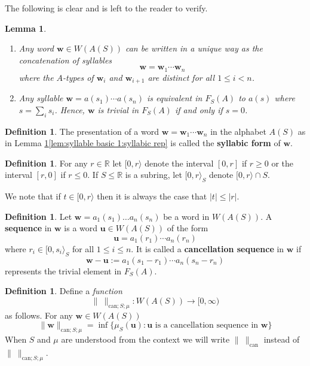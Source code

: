 \documentclass[12pt]{amsart}
\newtheorem{lemma}[prop]{Lemma}
\theoremstyle{definition}
\newtheorem{defn}[prop]{Definition}
\def\RR{\ensuremath{\mathbb{R}}}
\newcommand{\B}[1]{\mathbf{#1}}
\def\can{\text{can}}
\def\Free{F}
\newcommand{\myinterval}[1]{[ #1 \rangle}
\begin{document}
The following is clear and is left to the reader to verify.

\begin{lemma}\label{lem:syllable basic 1}
\begin{enumerate}[label=(\alph*)]
\item\label{lem:syllable basic 1:syllabic rep}
Any word $\B w \in W(A(S))$ can be written in a unique way as the concatenation of syllables
\[
\B w = \B w_1 \cdots \B w_n
\]
where the $A$-types of $\B w_i$ and  $\B w_{i+1}$ are distinct for all $1 \leq i <n$.

\item
Any syllable $\B w = a(s_1) \cdots a(s_n)$ is equivalent in $\Free_S(A)$ to $a(s)$ where $s=\sum_i s_i$.
Hence, $\B w$ is trivial in $\Free_S(A)$ if and only if $s=0$.
\end{enumerate}
\end{lemma}



\begin{defn}\label{def:syllabic representation}
The presentation of a word $\B w=\B w_1 \cdots \B w_n$ in the alphabet $A(S)$ as in Lemma \ref{lem:syllable basic 1}\ref{lem:syllable basic 1:syllabic rep} is called the {\bf syllabic form} of $\B w$.
\end{defn}


\begin{defn}
For any $r \in \RR$ let $\myinterval{0,r}$ denote the interval $[0,r]$ if $r \geq 0$ or the  interval $[r,0]$ if $r\leq 0$.
If $S \leq \RR$ is a subring, let $\myinterval{0,r}_S$ denote $\myinterval{0,r} \cap S$.
\end{defn}

We note that if $t \in \myinterval{0,r}$ then it is always the case that $|t| \leq |r|$.


\begin{defn}\label{defn:S-cancellation sequence}
Let $\B w =a_1(s_1) \dots a_n(s_n)$ be a word in $W(A(S))$.
A {\bf sequence} in $\B w$ is a word $\B u \in W(A(S))$ of the form
\[
\B u = a_1(r_1) \cdots a_n(r_n)
\]
where $r_i \in \myinterval{0,s_i}_S$ for all $1 \leq i \leq n$.
It is called a {\bf cancellation sequence} in $\B w$ if
\[
\B w - \B u := a_1(s_1-r_1) \cdots a_n(s_n-r_n)
\]
represents the trivial element in $\Free_S(A)$.
\end{defn}





\begin{defn}\label{defn:can norm on WAS}
Define a {\em function}
\[
\| \ \|_{\can;S;\mu} \colon W(A(S)) \to [0,\infty)
\]
as follows.
For any $\B w \in W(A(S))$
\[
\| \B w \|_{\can;S;\mu} = \inf \{ \mu_S(\B u) : \text{$\B u$ is a cancellation sequence in $\B w$} \}
\]
When $S$ and $\mu$ are understood from the context we will write $\| \ \|_{\can}$ instead of $\| \ \|_{\can;S;\mu}$.
\end{defn}
\end{document}
